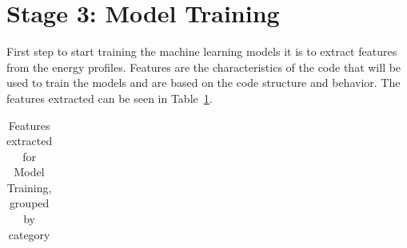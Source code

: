 \section{Stage 3: Model Training} \label{sec:work_stage3_model_training}



First step to start training the machine learning models it is to extract features from the energy profiles. Features are the characteristics of the code that will be used to train the models and are based on the code structure and behavior. The features extracted can be seen in Table~\ref{tab:features_extracted_grouped}.

\begin{table}[htbp]  
  \footnotesize
  \centering
  \caption{Features extracted for Model Training, grouped by category}
  \label{tab:features_extracted_grouped}
  \begin{tabularx}{\textwidth}{l X}


\end{tabularx}
\end{table}
